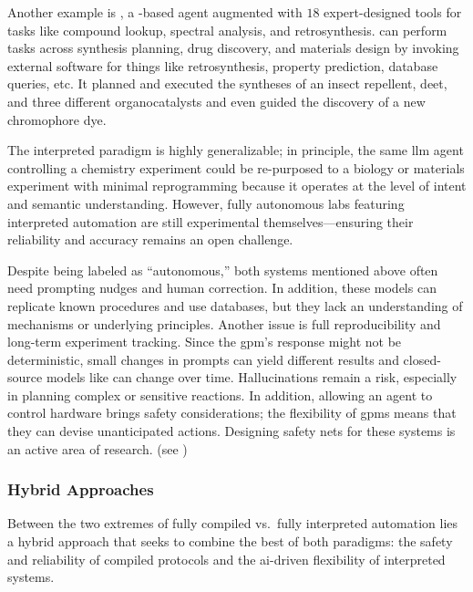 Another example is  \autocite{bran2024augmenting}, a -based agent augmented with $18$ expert-designed tools for tasks like compound lookup, spectral analysis, and retrosynthesis.  can perform tasks across synthesis planning, drug discovery, and materials design by invoking external software for things like retrosynthesis, property prediction, database queries, etc. 
It planned and executed the syntheses of an insect repellent, \gls{deet}, and three different organocatalysts and even guided the discovery of a new chromophore dye. 

The interpreted paradigm is highly generalizable; in principle, the same \gls{llm} agent controlling a chemistry experiment could be re-purposed to a biology or materials experiment with minimal reprogramming because it operates at the level of intent and semantic understanding. 
However, fully autonomous labs featuring interpreted automation are still experimental themselves---ensuring their reliability and accuracy remains an open challenge. 

Despite being labeled as \enquote{autonomous,} both systems mentioned above often need prompting nudges and human correction. 
In addition, these models can replicate known procedures and use databases, but they lack an understanding of mechanisms or underlying principles. Another issue is full reproducibility and long-term experiment tracking. Since the \gls{gpm}'s response might not be deterministic, small changes in prompts can yield different results and closed-source models like  can change over time. 
Hallucinations remain a risk, especially in planning complex or sensitive reactions. 
In addition, allowing an agent to control hardware brings safety considerations; the flexibility of \glspl{gpm} means that they can devise unanticipated actions. Designing safety nets for these systems is an active area of research. (see )

\subsubsection{Hybrid Approaches}
Between the two extremes of fully compiled vs.\ fully interpreted automation lies a hybrid approach that seeks to combine the best of both paradigms: the safety and reliability of compiled protocols and the \gls{ai}-driven flexibility of interpreted systems. 

